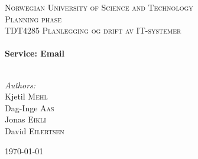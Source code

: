
\begin{titlepage}

\begin{center}
 

\textsc{\LARGE Norwegian University of Science and Technology}\\[1.5cm]

 
\textsc{\Large Planning phase}\\[0.5cm]

\textsc{\large TDT4285 Planlegging og drift av IT-systemer}\\[0.5cm]
 
 
\HRule \\[0.4cm]
{ \huge \bfseries Service: Email}\\[0.4cm]
 
\HRule \\[1.5cm]
 

\begin{center} \Large
\emph{Authors:}\\
Kjetil \textsc{Mehl}\\
Dag-Inge \textsc{Aas}\\
Jonas \textsc{Eikli}\\
David \textsc{Eilertsen}\\[3cm]
\end{center}
 

{\large \today}\\[4cm] %
 
\vfill
\end{center}

\end{titlepage}
